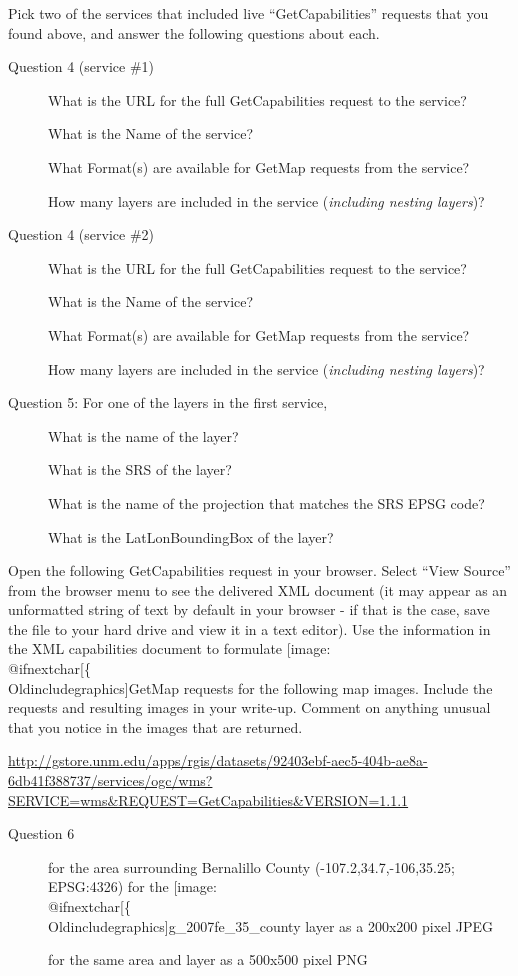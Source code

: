 \documentclass[]{book}
\makeatletter
\def\ScaleIfNeeded{%
  \ifdim\Gin@nat@width>.5\linewidth
    .5\linewidth
  \else
    \Gin@nat@width
  \fi
}
\let\Oldincludegraphics\texttt{[image: \%
 \\catcode`\\@=11\\relax\%
 \%\\gdef\\includegraphics\{\\@ifnextchar[\{\\Oldincludegraphics]}{\Oldincludegraphics[width=\ScaleIfNeeded]}}%
\gdef\texttt{[image: \\@ifnextchar[\{\\Oldincludegraphics]}{\Oldincludegraphics[max size={.75\textwidth}{.75\textheight}]}}%
\makeatother
\begin{document}
Pick two of the services that included live ``GetCapabilities'' requests
that you found above, and answer the following questions about each.

\begin{description}
\item[Question 4 (service \#1)]
What is the URL for the full GetCapabilities request to the service?

What is the Name of the service?

What Format(s) are available for GetMap requests from the service?

How many layers are included in the service (\emph{including nesting
layers})?
\item[Question 4 (service \#2)]
What is the URL for the full GetCapabilities request to the service?

What is the Name of the service?

What Format(s) are available for GetMap requests from the service?

How many layers are included in the service (\emph{including nesting
layers})?
\item[Question 5: For one of the layers in the first service,]
What is the name of the layer?

What is the SRS of the layer?

What is the name of the projection that matches the SRS EPSG code?

What is the LatLonBoundingBox of the layer?
\end{description}

Open the following GetCapabilities request in your browser. Select
``View Source'' from the browser menu to see the delivered XML document
(it may appear as an unformatted string of text by default in your
browser - if that is the case, save the file to your hard drive and view
it in a text editor). Use the information in the XML capabilities
document to formulate \texttt{GetMap} requests for the following map
images. Include the requests and resulting images in your write-up.
Comment on anything unusual that you notice in the images that are
returned.

\url{http://gstore.unm.edu/apps/rgis/datasets/92403ebf-aec5-404b-ae8a-6db41f388737/services/ogc/wms?SERVICE=wms\&REQUEST=GetCapabilities\&VERSION=1.1.1}

\begin{description}
\item[Question 6]
for the area surrounding Bernalillo County (-107.2,34.7,-106,35.25;
EPSG:4326) for the \texttt{g\_2007fe\_35\_county} layer as a 200x200
pixel JPEG

for the same area and layer as a 500x500 pixel PNG
\end{description}
\end{document}
